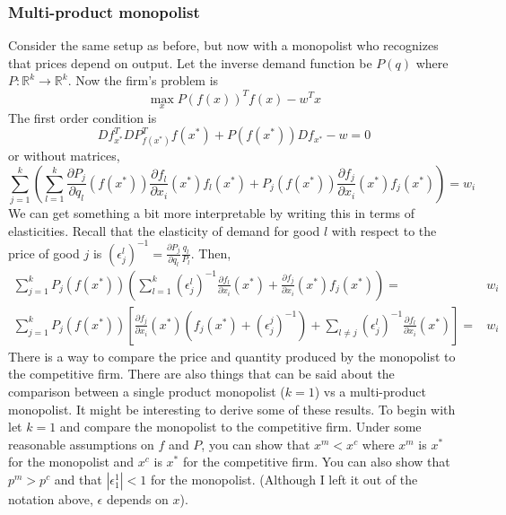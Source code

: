 \documentclass[compress]{beamer}
\def\R{\mathbb{R}}
\renewcommand{\to}{{\rightarrow}}
\begin{document}
\subsubsection{Multi-product monopolist}
Consider the same setup as before, but now with a monopolist who
recognizes that prices depend on output. Let the inverse demand
function be $P(q)$ where $P:\R^k \to \R^k$. Now the firm's problem
is 
\[ \max_x P(f(x))^T f(x) - w^T x \]
The first order condition is
\[ Df_{x^*}^T DP_{f(x^*)}^T f(x^*) + P(f(x^*)) Df_{x^*} - w = 0 \]
or without matrices,
\[ \sum_{j=1}^k \left( \sum_{l=1}^k \frac{\partial P_j}{\partial q_l}(f(x^*))
  \frac{\partial f_l}{\partial x_i}(x^*) f_l(x^*) + 
  P_j(f(x^*)) \frac{\partial f_j}{\partial x_i}(x^*) f_j(x^*) \right)
= w_i \]
We can get something a bit more interpretable by writing this in terms
of elasticities. Recall that the elasticity of demand for good $l$
with respect to the price of good $j$ is $(\epsilon^l_j)^{-1}=
\frac{\partial P_j}{\partial q_l} \frac{q_l}{P_l}$. Then,
\begin{align*}
  \sum_{j=1}^k P_j(f(x^*)) \left(\sum_{l=1}^k (\epsilon^l_j)^{-1} \frac{\partial
      f_l}{\partial x_i}(x^*) +  \frac{\partial f_j}{\partial x_i}(x^*) f_j(x^*) \right)
  = & w_i \\
  \sum_{j=1}^k P_j(f(x^*)) \left[\frac{\partial f_j}{\partial x_i}(x^*)
    \left(f_j(x^*) + (\epsilon_j^j)^{-1} \right) + \sum_{l \neq j}
  (\epsilon_j^l)^{-1} \frac{\partial f_l}{\partial x_i}(x^*) \right] = & w_i 
\end{align*}
There is a way to compare the price and quantity produced by the
monopolist to the competitive firm. There are also things that can be
said about the comparison between a single product monopolist ($k=1$)
vs a multi-product monopolist. It might be interesting to derive some
of these results. To begin with let $k = 1$ and compare the monopolist
to the competitive firm. Under some reasonable assumptions on $f$ and
$P$, you can show that $x^m < x^c$ where $x^m$ is $x^*$ for the
monopolist and $x^c$ is $x^*$ for the competitive firm. You can also
show that $p^m>p^c$ and that $|\epsilon^1_1| < 1$ for the
monopolist. (Although I left it out of the notation above, $\epsilon$
depends on $x$). 
\end{document}

